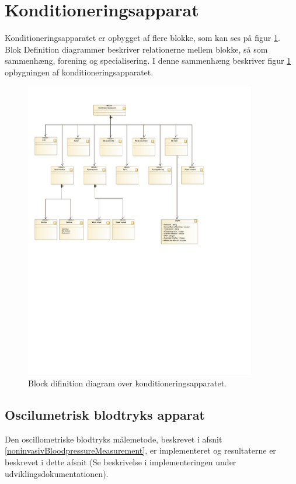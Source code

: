 \section{Konditioneringsapparat}
Konditioneringsapparatet er opbygget af flere blokke, som kan ses på figur \ref{fig:BDD(SystemOverview)}. Blok Definition diagrammer beskriver relationerne mellem blokke, så som sammenhæng, forening og specialisering. I denne sammenhæng beskriver figur \ref{fig:BDD(SystemOverview)} opbygningen af konditioneringsapparatet. 
\begin{figure}[H]
	\centering
	\includegraphics[width=0.9\textwidth]{billeder/BDD(SystemOverview).pdf}
	\caption{Block difinition diagram over konditioneringsapparatet.}\label{fig:BDD(SystemOverview)}
\end{figure}

\subsection{Oscilumetrisk blodtryks apparat}
Den oscillometriske blodtryks målemetode, beskrevet i afsnit \ref{noninvasivBloodpressureMeasurement}, er implementeret og resultaterne er beskrevet i dette afsnit (Se beskrivelse i implementeringen under udviklingsdokumentationen).

